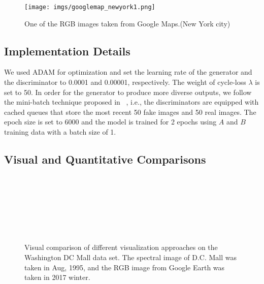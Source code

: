 \documentclass[10pt,conference,a4paper]{IEEEtran}
\begin{document}
\begin{figure}[t]
\centering
\texttt{[image: imgs/googlemap\_newyork1.png]}
\caption{One of the RGB images taken from Google Maps.(New York city)}
\label{fig:googlemap_newyork}
\end{figure}

\subsection{Implementation Details}

We used ADAM for optimization and set the learning rate of the generator and the discriminator to 0.0001 and 0.00001, respectively.
The weight of cycle-loss $\lambda$ is set to 50.
In order for the generator to produce more diverse outputs, we follow the mini-batch technique proposed in ~\cite{traingan2016}, i.e., the discriminators are equipped with cached queues that store the most recent 50 fake images and 50 real images.
The epoch size is set to  6000 and the model is trained for 2 epochs using $A$ and $B$ training data with a batch size of 1.

\subsection{Visual and Quantitative Comparisons}

\begin{figure}[!t]
\centering
{}
\\
\\
\\
\\
\\
\\
\caption{Visual comparison of different visualization approaches on the Washington DC Mall data set.
The spectral image of D.C. Mall was taken in Aug, 1995, and the RGB image from Google Earth was taken in 2017 winter.}
\label{fig:comparison}
\end{figure}
\end{document}
